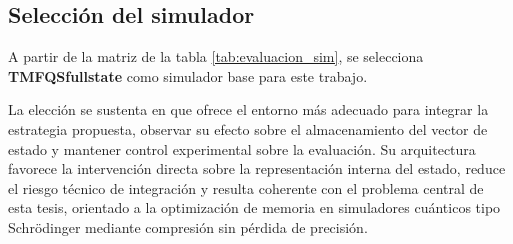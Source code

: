 \subsection{Selección del simulador}

A partir de la matriz de la tabla \ref{tab:evaluacion_sim}, se selecciona
\textbf{TMFQSfullstate} como simulador base para este trabajo.

La elección se sustenta en que ofrece el entorno más adecuado para integrar la
estrategia propuesta, observar su efecto sobre el almacenamiento del vector de estado y
mantener control experimental sobre la evaluación. Su arquitectura favorece la
intervención directa sobre la representación interna del estado, reduce el riesgo técnico
de integración y resulta coherente con el problema central de esta tesis, orientado a la
optimización de memoria en simuladores cuánticos tipo Schrödinger mediante
compresión sin pérdida de precisión.
